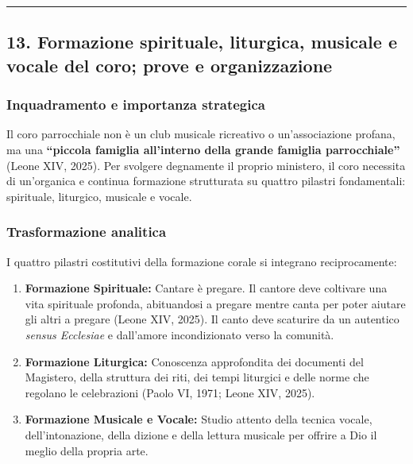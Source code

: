 \documentclass[12pt,a4paper]{article}
\begin{document}
	\begin{center}\rule{0.5\linewidth}{0.5pt}\end{center}
	
	\subsection{13. Formazione spirituale, liturgica, musicale e vocale del coro; prove e organizzazione}\label{formazione-spirituale-liturgica-musicale-e-vocale-del-coro-prove-e-organizzazione}
	
	\subsubsection{Inquadramento e importanza strategica}\label{inquadramento-e-importanza-strategica-11}
	
	Il coro parrocchiale non è un club musicale ricreativo o un'associazione profana, ma una \textbf{``piccola famiglia all'interno della grande famiglia parrocchiale''} (Leone XIV, 2025). Per svolgere degnamente il proprio ministero, il coro necessita di un'organica e continua formazione strutturata su quattro pilastri fondamentali: spirituale, liturgico, musicale e vocale.
	
	\subsubsection{Trasformazione analitica}\label{trasformazione-analitica-12}
	
	I quattro pilastri costitutivi della formazione corale si integrano reciprocamente:
	
	\begin{enumerate}[label=\arabic*.,leftmargin=*]
		\item \textbf{Formazione Spirituale:} Cantare è pregare. Il cantore deve coltivare una vita spirituale profonda, abituandosi a pregare mentre canta per poter aiutare gli altri a pregare (Leone XIV, 2025). Il canto deve scaturire da un autentico \emph{sensus Ecclesiae} e dall'amore incondizionato verso la comunità.
		\item \textbf{Formazione Liturgica:} Conoscenza approfondita dei documenti del Magistero, della struttura dei riti, dei tempi liturgici e delle norme che regolano le celebrazioni (Paolo VI, 1971; Leone XIV, 2025).
		\item \textbf{Formazione Musicale e Vocale:} Studio attento della tecnica vocale, dell'intonazione, della dizione e della lettura musicale per offrire a Dio il meglio della propria arte.
	\end{enumerate}
	
\end{document}
